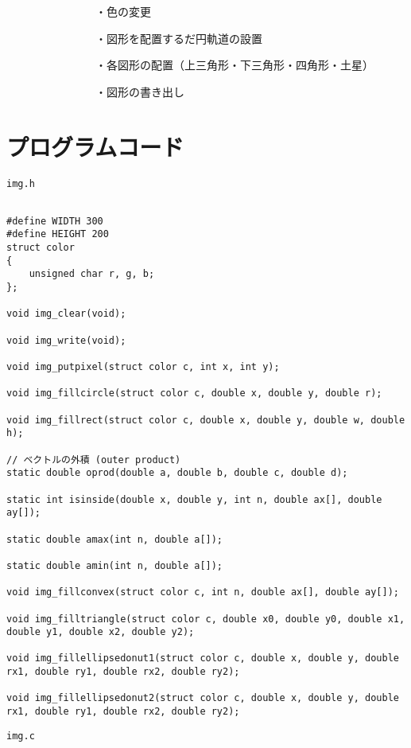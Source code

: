 \documentclass[12pt,a4j]{jarticle}
\begin{document}
　　　　　　　　・色の変更

　　　　　　　　・図形を配置するだ円軌道の設置

　　　　　　　　・各図形の配置（上三角形・下三角形・四角形・土星）

　　　　　　　　・図形の書き出し

\section{プログラムコード}

\verb|img.h|

\begin{verbatim}

#define WIDTH 300
#define HEIGHT 200
struct color
{
    unsigned char r, g, b;
};

void img_clear(void);

void img_write(void);

void img_putpixel(struct color c, int x, int y);

void img_fillcircle(struct color c, double x, double y, double r);

void img_fillrect(struct color c, double x, double y, double w, double h);

// ベクトルの外積 (outer product)
static double oprod(double a, double b, double c, double d);

static int isinside(double x, double y, int n, double ax[], double ay[]);

static double amax(int n, double a[]);

static double amin(int n, double a[]);

void img_fillconvex(struct color c, int n, double ax[], double ay[]);

void img_filltriangle(struct color c, double x0, double y0, double x1, double y1, double x2, double y2);

void img_fillellipsedonut1(struct color c, double x, double y, double rx1, double ry1, double rx2, double ry2);

void img_fillellipsedonut2(struct color c, double x, double y, double rx1, double ry1, double rx2, double ry2);

\end{verbatim}

\verb|img.c|
\end{document}
